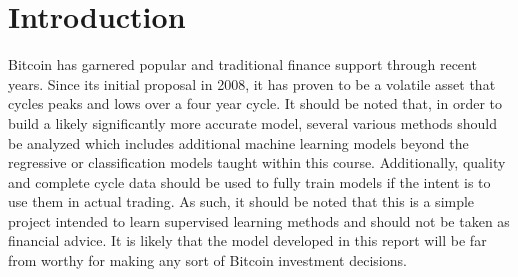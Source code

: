 \section{Introduction}\label{sec:introduction}

Bitcoin has garnered popular and traditional finance support through recent years. Since its initial proposal in 2008,
it has proven to be a volatile asset that cycles peaks and lows over a four year cycle. It should be noted that,
in order to build a likely significantly more accurate model, several various methods should be analyzed which includes
additional machine learning models beyond the regressive or classification models taught within this course.
Additionally, quality and complete cycle data should be used to fully train models if the intent is to use them in
actual trading. As such, it should be noted that this is a simple project intended to learn supervised learning methods
and should not be taken as financial advice. It is likely that the model developed in this report will be far from
worthy for making any sort of Bitcoin investment decisions.
